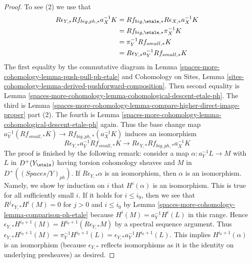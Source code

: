 \begin{proof}
\medskip\noindent
To see (2) we use that
\begin{align*}
R\epsilon_{Y, *}Rf_{big, ph, *}a_X^{-1}K
& =
Rf_{big, \etale, *}R\epsilon_{X, *}a_X^{-1}K \\
& =
Rf_{big, \etale, *}\pi_X^{-1}K \\
& =
\pi_Y^{-1}Rf_{small, *}K \\
& =
R\epsilon_{Y, *} a_Y^{-1}Rf_{small, *}K
\end{align*}
The first equality by the commutative diagram in
Lemma \ref{spaces-more-cohomology-lemma-push-pull-ph-etale}
and Cohomology on Sites, Lemma
\ref{sites-cohomology-lemma-derived-pushforward-composition}.
Then second equality is Lemma \ref{spaces-more-cohomology-lemma-cohomological-descent-etale-ph}.
The third is
Lemma \ref{spaces-more-cohomology-lemma-compare-higher-direct-image-proper} part (2).
The fourth is Lemma \ref{spaces-more-cohomology-lemma-cohomological-descent-etale-ph} again.
Thus the base change map
$a_Y^{-1}(Rf_{small, *}K) \to Rf_{big, ph, *}(a_X^{-1}K)$
induces an isomorphism
$$
R\epsilon_{Y, *}a_Y^{-1}Rf_{small, *}K \to
R\epsilon_{Y, *}Rf_{big, ph, *}a_X^{-1}K
$$
The proof is finished by the following remark: consider a map
$\alpha : a_Y^{-1}L \to M$ with $L$ in $D^+(Y_\etale)$
having torsion cohomology sheaves
and $M$ in $D^+((\textit{Spaces}/Y)_{ph})$. If
$R\epsilon_{Y, *}\alpha$ is an isomorphism, then $\alpha$ is an isomorphism.
Namely, we show by induction on $i$ that $H^i(\alpha)$ is an isomorphism.
This is true for all sufficiently small $i$.
If it holds for $i \leq i_0$, then we see that
$R^j\epsilon_{Y, *}H^i(M) = 0$ for $j > 0$ and $i \leq i_0$
by Lemma \ref{spaces-more-cohomology-lemma-comparison-ph-etale}
because $H^i(M) = a_Y^{-1}H^i(L)$ in this range.
Hence $\epsilon_{Y, *}H^{i_0 + 1}(M) = H^{i_0 + 1}(R\epsilon_{Y, *}M)$
by a spectral sequence argument.
Thus $\epsilon_{Y, *}H^{i_0 + 1}(M) = \pi_Y^{-1}H^{i_0 + 1}(L) =
\epsilon_{Y, *}a_Y^{-1}H^{i_0 + 1}(L)$.
This implies $H^{i_0 + 1}(\alpha)$ is an isomorphism
(because $\epsilon_{Y, *}$ reflects isomorphisms as it is the
identity on underlying presheaves) as desired.
\end{proof}



